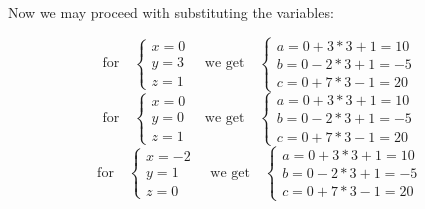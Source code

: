 Now we may proceed with substituting the variables:
\begin{tasks}
    \task \begin{equation*}
      \text{for}\quad
  \begin{cases}
    x=0\\
    y=3\\
    z=1
  \end{cases}\quad
  \text{we get}\quad
  \begin{cases}
    a=0+3*3+1=10\\
    b=0-2*3+1=-5\\
    c=0+7*3-1=20
  \end{cases}
  \end{equation*}
  \task \begin{equation*}
  \text{for}\quad
  \begin{cases}
    x=0\\
    y=0\\
    z=1
  \end{cases}\quad
  \text{we get}\quad
  \begin{cases}
    a=0+3*3+1=10\\
    b=0-2*3+1=-5\\
    c=0+7*3-1=20
  \end{cases}
  \end{equation*}
  \task \begin{equation*}
  \text{for}\quad
  \begin{cases}
    x=-2\\
    y=1\\
    z=0
  \end{cases}\quad
  \text{we get}\quad
  \begin{cases}
    a=0+3*3+1=10\\
    b=0-2*3+1=-5\\
    c=0+7*3-1=20
  \end{cases}
\end{equation*}
\end{tasks}




